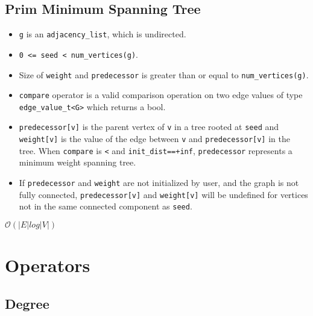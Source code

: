 \subsection{Prim Minimum Spanning Tree}

{\small
      
}
\begin{itemdescr}
      \pnum\preconditions
      \begin{itemize}
            \item
                  \lstinline{g} is an \lstinline{adjacency_list}, which is undirected.
            \item
                  \lstinline{0 <= seed < num_vertices(g)}.
            \item
                  Size of \lstinline{weight} and \lstinline{predecessor} is greater than or equal to \lstinline{num_vertices(g)}.
            \item
                  \lstinline{compare} operator is a valid comparison operation on two edge values of type \lstinline{edge_value_t<G>} which returns a bool.
      \end{itemize}
      \pnum\effects
      \begin{itemize}
            \item
                  \lstinline{predecessor[v]} is the parent vertex of \lstinline{v} in a tree rooted at \lstinline{seed} and \lstinline{weight[v]} is the value of the edge between \lstinline{v} and \lstinline{predecessor[v]} in the tree. When \lstinline{compare} is \lstinline{<} and \lstinline{init_dist==+inf}, \lstinline{predecessor} represents a minimum weight spanning tree.
            \item
                  If \lstinline{predecessor} and \lstinline{weight} are not initialized by user, and the graph is not fully connected, \lstinline{predecessor[v]} and \lstinline{weight[v]} will be undefined for vertices not in the same connected component as \lstinline{seed}.
      \end{itemize}

      \pnum\complexity $\mathcal{O}(|E|log|V|)$
\end{itemdescr}

\section{Operators}
\subsection{Degree}

